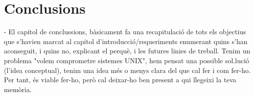 \section{Conclusions}
        - El capitol de conclussions, bàsicament fa una
        recapitulació de tots els objectius que s'havien
        marcat al capitol d'introducció/requeriments
        enumerant quins s'han aconseguit, i quins no,
        explicant el perquè, i les futures linies de treball.
Tenim un
        problema "volem comprometre sistemes UNIX", hem
        pensat una possible sol.lució (l'idea conceptual),
        tenim una idea més o menys clara del que cal fer i
        com fer-ho. Per tant, és viable fer-ho, però cal
        deixar-ho ben present a qui llegeixi la teva memòria.
